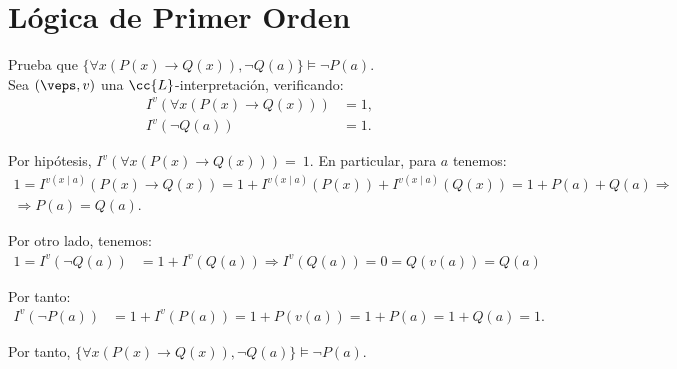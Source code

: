 \section{Lógica de Primer Orden}

\begin{ejercicio}\label{ej:2.1}
    Prueba que $\{\forall x(P(x) \rightarrow Q(x)), \neg Q(a)\} \models \neg P(a)$.\\

    Sea $(\veps,v)$ una $\cc{L}$-interpretación, verificando:
    \begin{align*}
        I^v(\forall x(P(x) \rightarrow Q(x))) &= 1,\\
        I^v(\neg Q(a)) &= 1.
    \end{align*}

    Por hipótesis, $I^v(\forall x(P(x) \rightarrow Q(x))) =~1$. En particular, para $a$ tenemos:
    \begin{multline*}
        1 = I^{v(x\mid a)}(P(x) \rightarrow Q(x))
        = 1+I^{v(x\mid a)}(P(x))+I^{v(x\mid a)}(Q(x))=1+P(a)+Q(a)
        \Longrightarrow \\ \Longrightarrow P(a) = Q(a).
    \end{multline*}
    
    
    Por otro lado, tenemos:
    \begin{align*}
        1 = I^v(\neg Q(a)) &= 1+I^v(Q(a))\Longrightarrow I^v(Q(a)) = 0
        = Q(v(a)) = Q(a)
    \end{align*}

    Por tanto:
    \begin{align*}
        I^v(\neg P(a)) &= 1+I^v(P(a)) = 1+P(v(a)) = 1+P(a) = 1+Q(a) = 1.
    \end{align*}

    Por tanto, $\{\forall x(P(x) \rightarrow Q(x)), \neg Q(a)\} \models \neg P(a)$.
\end{ejercicio}


